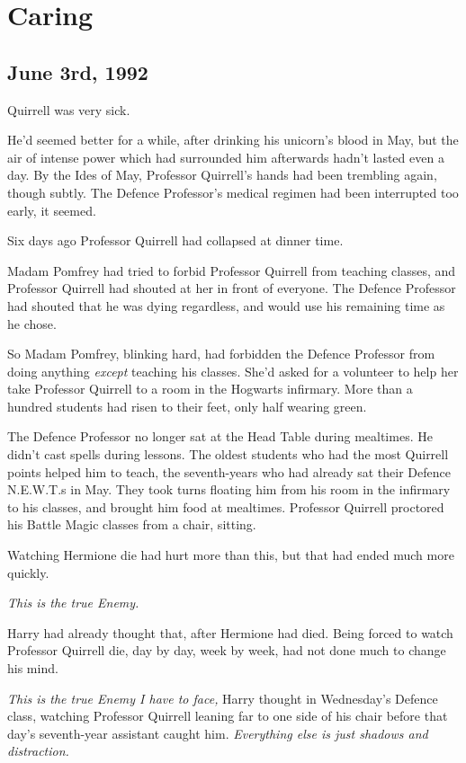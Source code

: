 \chapter{Caring}

\section{June 3rd, 1992}

 Quirrell was very sick.

\hplettrineextrapara
He'd seemed better for a while, after drinking his unicorn's blood in May, but the air of intense power which had surrounded him afterwards hadn't lasted even a day. By the Ides of May, Professor Quirrell's hands had been trembling again, though subtly. The Defence Professor's medical regimen had been interrupted too early, it seemed.

Six days ago Professor Quirrell had collapsed at dinner time.

Madam Pomfrey had tried to forbid Professor Quirrell from teaching classes, and Professor Quirrell had shouted at her in front of everyone. The Defence Professor had shouted that he was dying regardless, and would use his remaining time as he chose.

So Madam Pomfrey, blinking hard, had forbidden the Defence Professor from doing anything \emph{except} teaching his classes. She'd asked for a volunteer to help her take Professor Quirrell to a room in the Hogwarts infirmary. More than a hundred students had risen to their feet, only half wearing green.

The Defence Professor no longer sat at the Head Table during mealtimes. He didn't cast spells during lessons. The oldest students who had the most Quirrell points helped him to teach, the seventh-years who had already sat their Defence N.E.W.T.s in May. They took turns floating him from his room in the infirmary to his classes, and brought him food at mealtimes. Professor Quirrell proctored his Battle Magic classes from a chair, sitting.

Watching Hermione die had hurt more than this, but that had ended much more quickly.

\emph{This is the true Enemy.}

Harry had already thought that, after Hermione had died. Being forced to watch Professor Quirrell die, day by day, week by week, had not done much to change his mind.

\emph{This is the true Enemy I have to face,} Harry thought in Wednesday's Defence class, watching Professor Quirrell leaning far to one side of his chair before that day's seventh-year assistant caught him. \emph{Everything else is just shadows and distraction.}

